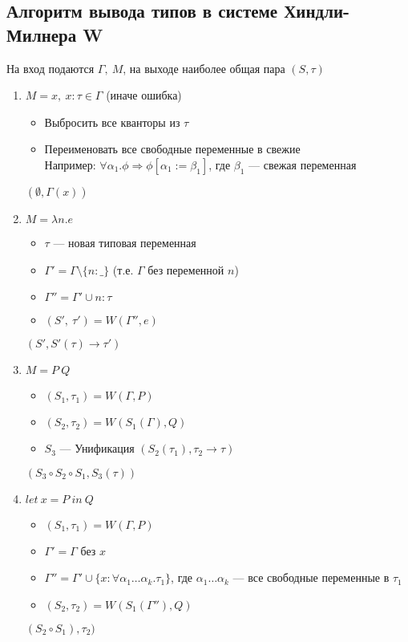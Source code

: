 \subsection{Алгоритм вывода типов в системе Хиндли-Милнера W}
На вход подаются $\Gamma,\ M$, на выходе наиболее общая пара $(S, \tau)$
\begin{enumerate}
    \item $M = x ,\ x:\tau  \in \Gamma$ (иначе ошибка)
    \begin{itemize}
        \item Выбросить все кванторы из $\tau$
        \item Переименовать все свободные переменные в свежие \\
        Например: $\forall \alpha_1.\phi \Rightarrow \phi[\alpha_1 := \beta_1]$, где $\beta_1$ --- свежая переменная
    \end{itemize}
    $(\emptyset, \Gamma(x))$
    \item $M = \lambda n.e$
    \begin{itemize}
        \item $\tau$ --- новая типовая переменная
        \item $\Gamma' = \Gamma \setminus \{n : \_ \}$ (т.е. $\Gamma$ без переменной $n$)
        \item $\Gamma'' = \Gamma' \cup {n : \tau}$
        \item $(S',\ \tau') = W(\Gamma'', e)$
    \end{itemize}
    $(S', S'(\tau) \rightarrow \tau')$
    \item $M = P\ Q$
    \begin{itemize}
        \item $(S_1, \tau_1) = W(\Gamma, P)$
        \item $(S_2, \tau_2) = W(S_1(\Gamma), Q)$
        \item $S_3$ --- Унификация $(S_2(\tau_1), \tau_2 \rightarrow \tau)$
    \end{itemize}
    $(S_3 \circ S_2 \circ S_1, S_3(\tau))$
    \item $let\ x = P\ in\ Q$
    \begin{itemize}
        \item $(S_1, \tau_1) = W(\Gamma, P)$
        \item $\Gamma' = \Gamma$ без $x$
        \item $\Gamma'' = \Gamma' \cup \{ x : \forall \alpha_1 \dots \alpha_k. \tau_1 \}$, где $\alpha_1 \dots \alpha_k$ --- все свободные переменные в $\tau_1$
        \item $(S_2, \tau_2) = W(S_1(\Gamma''), Q)$
    \end{itemize}
    $(S_2 \circ S_1), \tau_2)$
\end{enumerate}

